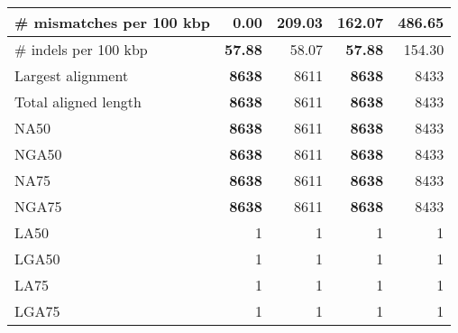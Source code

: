 \documentclass[12pt,a4paper]{article}
\begin{document}
\begin{table}[ht]
\begin{center}
\begin{tabular}{|l*{4}{|r}|}
\# mismatches per 100 kbp & {\bf 0.00} & 209.03 & 162.07 & 486.65 \\ \hline
\# indels per 100 kbp & {\bf 57.88} & 58.07 & {\bf 57.88} & 154.30 \\ \hline
Largest alignment & {\bf 8638} & 8611 & {\bf 8638} & 8433 \\ \hline
Total aligned length & {\bf 8638} & 8611 & {\bf 8638} & 8433 \\ \hline
NA50 & {\bf 8638} & 8611 & {\bf 8638} & 8433 \\ \hline
NGA50 & {\bf 8638} & 8611 & {\bf 8638} & 8433 \\ \hline
NA75 & {\bf 8638} & 8611 & {\bf 8638} & 8433 \\ \hline
NGA75 & {\bf 8638} & 8611 & {\bf 8638} & 8433 \\ \hline
LA50 & 1 & 1 & 1 & 1 \\ \hline
LGA50 & 1 & 1 & 1 & 1 \\ \hline
LA75 & 1 & 1 & 1 & 1 \\ \hline
LGA75 & 1 & 1 & 1 & 1 \\ \hline
\end{tabular}
\end{center}
\end{table}
\end{document}
